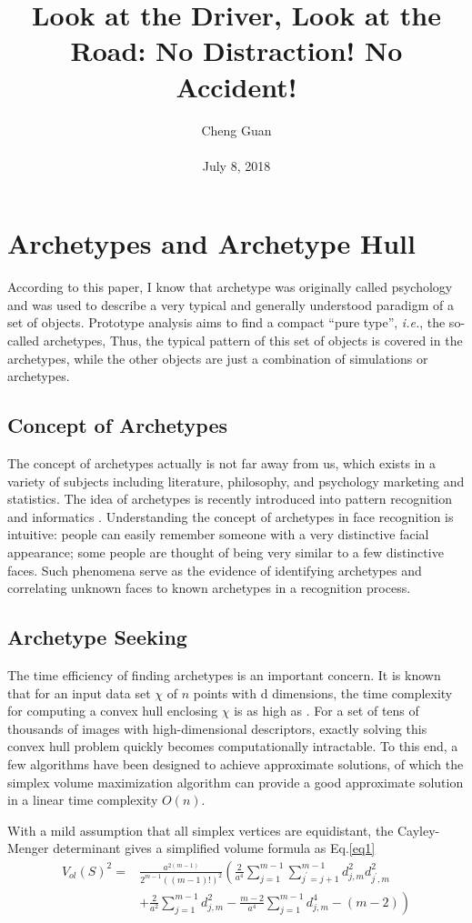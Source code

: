 \documentclass[10pt,twocolumn,letterpaper]{article}
\title{Look at the Driver, Look at the Road: No Distraction! No Accident!}
\author{Cheng Guan\\\\
July 8, 2018}
\begin{document}
\maketitle
\section{Archetypes and Archetype Hull}
According to this paper, I know that archetype was originally called psychology \cite{jung2014archetypes} and was used to describe a very typical and generally understood paradigm of a set of objects. Prototype analysis aims to find a compact ``pure type'', \emph{i.e.}, the so-called archetypes, Thus, the typical pattern of this set of objects is covered in the archetypes, while the other objects are just a combination of simulations or archetypes.
\subsection{Concept of Archetypes}
The concept of archetypes actually is not far away from us, which exists in a variety of
subjects including literature, philosophy, and psychology
marketing \cite{li2003archetypal} and statistics\cite{eugster2011weighted}. The idea of archetypes is
recently introduced into pattern recognition and informatics
\cite{thurau2010yes,seiler2013archetypal}. Understanding the concept of archetypes
in face recognition is intuitive: people can easily remember
someone with a very distinctive facial appearance; some
people are thought of being very similar to a few distinctive
faces. Such phenomena serve as the evidence of identifying
archetypes and correlating unknown faces to known
archetypes in a recognition process.
\subsection{Archetype Seeking}
The time efficiency of finding archetypes is an important
concern. It is known that for an input data set $\chi$ of
$n$ points with d dimensions, the time complexity for computing
a convex hull enclosing $\chi$ is as high as 
\cite{thurau2010nearest,thurau2010yes}. For a set of tens of thousands of images with
high-dimensional descriptors, exactly solving this convex
hull problem quickly becomes computationally intractable.
To this end, a few algorithms have been designed to achieve
approximate solutions, of which the simplex volume maximization
algorithm \cite{thurau2010yes} can provide a good approximate
solution in a linear time complexity $O\left(n\right)$.
\par
With a mild assumption that all simplex vertices
are equidistant, the Cayley-Menger determinant gives
a simplified volume formula as Eq.\ref{eq1}
\begin{equation}
\begin{aligned}
V_{ol}{\left(S\right)}^2=&\frac{a^{2\left(m-1\right)}}{2^{m-1}{\left(\left(m-1\right)!\right)}^2} 
\left( {\frac{2}{a^4}\sum_{j=1}^{m-1}\sum_{j^\prime=j+1}^{m-1}d_{j,m}^2 d_{j^\prime,m}^2} \right. \\& + \left.{\frac{2}{a^2}\sum_{j=1}^{m-1}d_{j,m}^2 - \frac{m-2}{a^4}\sum_{j=1}^{m-1}d_{j,m}^4-\left(m-2\right)}\right)
\end{aligned}
\label{eq1}
\end{equation}
\end{document}
